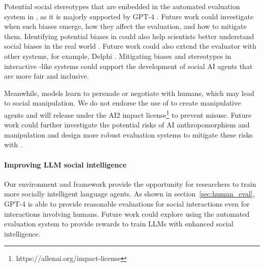 Potential social stereotypes that are embedded in the automated evaluation system in \sotopia, as it is majorly supported by GPT-4 \citep{cheng-etal-2023-marked}.
Future work could investigate when such biases emerge, how they affect the evaluation, and how to mitigate them.
Identifying potential biases in \sotopia could also help scientists better understand social biases in the real world \citep{zhou-etal-2020-debiasing}.
Future work could also extend the evaluator with other systems, for example, Delphi \citep{jiang2022machines}.
Mitigating biases and stereotypes in interactive \sotopia-like systems could support the development of social AI agents that are more fair and inclusive.

Meanwhile, models learn to persuade or negotiate with humans, which may lead to social manipulation.
We do not endorse the use of \sotopia to create manipulative agents and will release \sotopia under the AI2 impact license\footnote{https://allenai.org/impact-license} to prevent misuse. 
Future work could further investigate the potential risks of AI anthropomorphism and manipulation and design more robust evaluation systems to mitigate these risks with \sotopia.




\paragraph{Improving LLM social intelligence}
Our \sotopia environment and  \sotopiaeval framework provide the opportunity for researchers to train more socially intelligent language agents.
As shown in section~\ref{sec:human_eval}, GPT-4 is able to provide reasonable evaluations for social interactions even for interactions involving humans. 
Future work could explore using the automated evaluation system to provide rewards to train LLMs with enhanced social intelligence.
